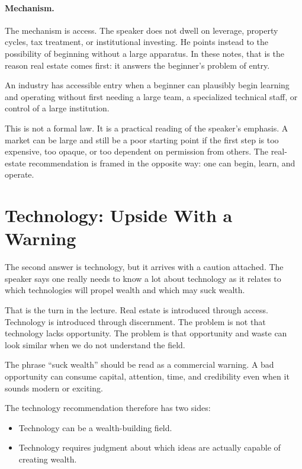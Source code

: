 \paragraph{Mechanism.}
The mechanism is access. The speaker does not dwell on leverage, property cycles, tax treatment, or institutional investing. He points instead to the possibility of beginning without a large apparatus. In these notes, that is the reason real estate comes first: it answers the beginner's problem of entry.

\begin{definition}
An industry has accessible entry when a beginner can plausibly begin learning and operating without first needing a large team, a specialized technical staff, or control of a large institution.
\end{definition}

This is not a formal law. It is a practical reading of the speaker's emphasis. A market can be large and still be a poor starting point if the first step is too expensive, too opaque, or too dependent on permission from others. The real-estate recommendation is framed in the opposite way: one can begin, learn, and operate.

\section{Technology: Upside With a Warning}

The second answer is technology, but it arrives with a caution attached. The speaker says one really needs to know a lot about technology as it relates to which technologies will propel wealth and which may suck wealth.

That is the turn in the lecture. Real estate is introduced through access. Technology is introduced through discernment. The problem is not that technology lacks opportunity. The problem is that opportunity and waste can look similar when we do not understand the field.

\begin{remark}
The phrase ``suck wealth'' should be read as a commercial warning. A bad opportunity can consume capital, attention, time, and credibility even when it sounds modern or exciting.
\end{remark}

The technology recommendation therefore has two sides:

\begin{itemize}
\item Technology can be a wealth-building field.
\item Technology requires judgment about which ideas are actually capable of creating wealth.
\end{itemize}

